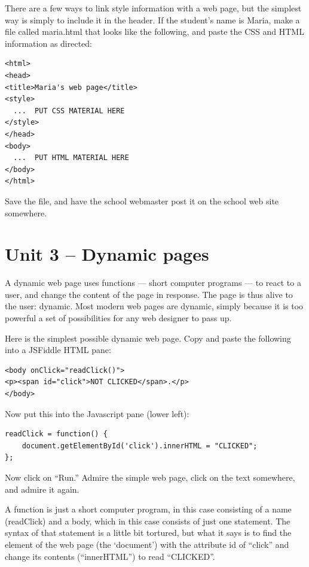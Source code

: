 \documentclass[11pt]{article}
\begin{document}
There are a few ways to link style information with a web page, but
the simplest way is simply to include it in the header.  If the
student's name is Maria, make a file called maria.html that
looks like the following, and paste the CSS and HTML information as
directed:

\begin{verbatim}
<html>
<head>
<title>Maria's web page</title>
<style>
  ...  PUT CSS MATERIAL HERE
</style>
</head>
<body>
  ...  PUT HTML MATERIAL HERE
</body>
</html>
\end{verbatim}

Save the file, and have the school webmaster post it on the school web
site somewhere.


\section{Unit 3 -- Dynamic pages}

A dynamic web page uses functions --- short computer programs --- to
react to a user, and change the content of the page in response.  The
page is thus alive to the user: dynamic.  Most modern web pages are
dynamic, simply because it is too powerful a set of possibilities for
any web designer to pass up.

Here is the simplest possible dynamic web page.  Copy and paste the
following into a JSFiddle HTML pane:

\begin{verbatim}
<body onClick="readClick()">
<p><span id="click">NOT CLICKED</span>.</p>
</body>
\end{verbatim}

Now put this into the Javascript pane (lower left):

\begin{verbatim}
readClick = function() {
    document.getElementById('click').innerHTML = "CLICKED";
};
\end{verbatim}

Now click on ``Run.''  Admire the simple web page, click on the text
somewhere, and admire it again.

A function is just a short computer program, in this case consisting
of a name (readClick) and a body, which in this case consists of just
one statement.  The syntax of that statement is a little bit tortured,
but what it says is to find the element of the web page (the
`document') with the attribute id of ``click'' and change its contents
(``innerHTML'') to read ``CLICKED''.
\end{document}
